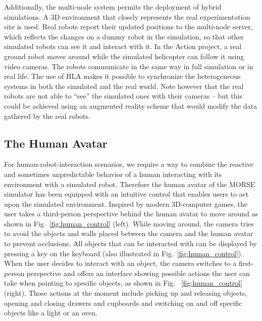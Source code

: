\documentclass{llncs}
\begin{document}
Additionally, the multi-node system permits the deployment of hybrid
simulations. A 3D environment that closely represents the real experimentation
site is used. Real robots report their updated positions to the multi-node
server, which reflects the changes on a dummy robot 
in the simulation, so that other simulated robots can see it and interact with it.
In the Action project, a real ground robot moves around while the simulated
helicopter can follow it using video cameras.
The robots communicate in the same way in full simulation or in
real life. The use of HLA makes it possible to synchronize the heterogeneous
systems in both the simulated and the real world. Note however that 
the real robots are not able to ``see'' the simulated ones with their
cameras -- but this could be achieved using an augmented reality scheme that
would modify the data gathered by the real robots.

\subsection{The Human Avatar}
\label{section:human}

For human-robot-interaction scenarios, we require a way to combine the
reactive and sometimes unpredictable behavior of a human interacting with its
environment with a simulated robot. Therefore the human avatar of the MORSE
simulator has been equipped with an intuitive control that enables users to act
upon the simulated environment. Inspired by modern 3D-computer games, the user
takes a third-person perspective behind the human avatar to move around as
shown in Fig.~\ref{fig:human_control} (left).
While moving around, the camera tries to avoid the objects and walls placed
between the camera and the human avatar to prevent occlusions.  All objects
that can be interacted with can be displayed by pressing a key on the
keyboard (also illustrated in Fig.~\ref{fig:human_control}). When the user
decides to interact with an object, the camera switches to a first-person
perspective and offers an interface showing possible actions the
user can take when pointing to specific objects, as shown in Fig.~
\ref{fig:human_control} (right). Those actions at the moment include
picking up and releasing objects, opening and closing drawers and cupboards and
switching on and off specific objects like a light or an oven.
\end{document}
